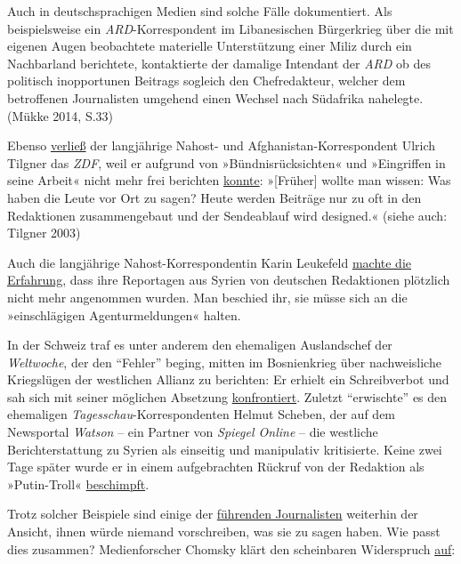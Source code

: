Auch in deutschsprachigen Medien sind solche Fälle dokumentiert. Als
beispielsweise ein \emph{ARD}-Korrespondent im Libanesischen Bürgerkrieg
über die mit eigenen Augen beobachtete materielle Unterstützung einer
Miliz durch ein Nachbarland berichtete, kontaktierte der damalige
Intendant der \emph{ARD} ob des politisch inopportunen Beitrags sogleich
den Chefredakteur, welcher dem betroffenen Journalisten umgehend einen
Wechsel nach Südafrika nahelegte. (Mükke 2014, S.33)

Ebenso
\href{http://www.berliner-zeitung.de/korrespondent-ulrich-tilgner-sucht-mehr-distanz-zum-zdf--ich-fuehle-mich-eingeschraenkt--15870684}{verließ}
der langjährige Nahost- und Afghanistan-Korrespondent Ulrich Tilgner das
\emph{ZDF}, weil er aufgrund von »Bündnisrücksichten« und »Eingriffen in
seine Arbeit« nicht mehr frei berichten
\href{https://web.archive.org/web/20080211184752/http://www.neue-oz.de/information/noz_print/interviews/tilgner.html}{konnte}:
»{[}Früher{]} wollte man wissen: Was haben die Leute vor Ort zu sagen?
Heute werden Beiträge nur zu oft in den Redaktionen zusammengebaut und
der Sendeablauf wird designed.« (siehe auch: Tilgner 2003)

Auch die langjährige Nahost-Korrespondentin Karin Leukefeld
\href{https://www.watson.ch/International/Kommentar/148360008-Spielball-der-M\%C3\%A4chte--Weshalb-der-Syrien-Konflikt-in-erster-Linie-ein-Stellvertreterkrieg-ist}{machte
die Erfahrung}, dass ihre Reportagen aus Syrien von deutschen
Redaktionen plötzlich nicht mehr angenommen wurden. Man beschied ihr,
sie müsse sich an die »einschlägigen Agenturmeldungen« halten.

In der Schweiz traf es unter anderem den ehemaligen Auslandschef der
\emph{Weltwoche}, der den ``Fehler'' beging, mitten im Bosnienkrieg über
nachweisliche Kriegslügen der westlichen Allianz zu berichten: Er
erhielt ein Schreibverbot und sah sich mit seiner möglichen Absetzung
\href{https://swprs.org/das-gewuenschte-narrativ}{konfrontiert}. Zuletzt
``erwischte'' es den ehemaligen \emph{Tagesschau}-Korrespondenten Helmut
Scheben, der auf dem Newsportal \emph{Watson} -- ein Partner von
\emph{Spiegel Online} -- die westliche Berichterstattung zu Syrien als
einseitig und manipulativ kritisierte. Keine zwei Tage später wurde er
in einem aufgebrachten Rückruf von der Redaktion als »Putin-Troll«
\href{https://swprs.org/das-gewuenschte-narrativ-ii/}{beschimpft}.

Trotz solcher Beispiele sind einige der
\href{https://www.youtube.com/watch?v=xmPCwjrJjRc}{führenden
Journalisten} weiterhin der Ansicht, ihnen würde niemand vorschreiben,
was sie zu sagen haben. Wie passt dies zusammen? Medienforscher Chomsky
klärt den scheinbaren Widerspruch
\href{https://chomsky.info/199710__/}{auf}:

